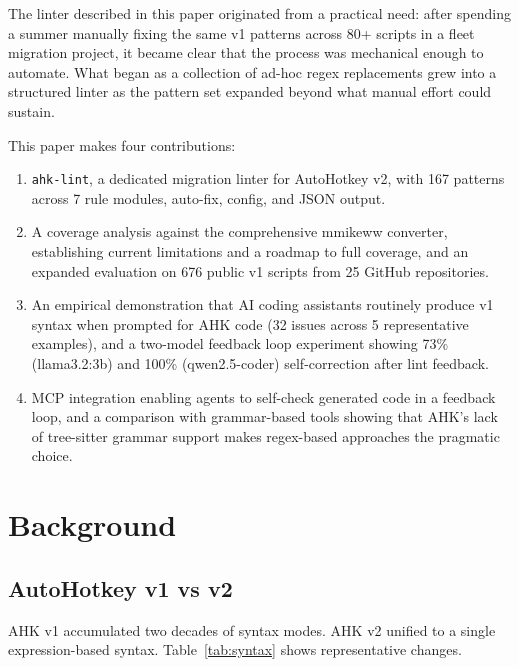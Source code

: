 \documentclass[11pt,a4paper]{article}
\begin{document}
The linter described in this paper originated from a practical need: after spending a summer manually fixing the same v1 patterns across 80+ scripts in a fleet migration project, it became clear that the process was mechanical enough to automate. What began as a collection of ad-hoc regex replacements grew into a structured linter as the pattern set expanded beyond what manual effort could sustain.

This paper makes four contributions:
\begin{enumerate}
   \item \texttt{ahk-lint}, a dedicated migration linter for AutoHotkey v2, with 167 patterns across 7 rule modules, auto-fix, config, and JSON output.
  \item A coverage analysis against the comprehensive mmikeww converter, establishing current limitations and a roadmap to full coverage, and an expanded evaluation on 676 public v1 scripts from 25 GitHub repositories.
  \item An empirical demonstration that AI coding assistants routinely produce v1 syntax when prompted for AHK code (32 issues across 5 representative examples), and a two-model feedback loop experiment showing 73\% (llama3.2:3b) and 100\% (qwen2.5-coder) self-correction after lint feedback.
  \item MCP integration enabling agents to self-check generated code in a feedback loop, and a comparison with grammar-based tools showing that AHK's lack of tree-sitter grammar support makes regex-based approaches the pragmatic choice.
\end{enumerate}

\section{Background}

\subsection{AutoHotkey v1 vs v2}

AHK v1 accumulated two decades of syntax modes. AHK v2 unified to a single expression-based syntax. Table~\ref{tab:syntax} shows representative changes.
\end{document}

